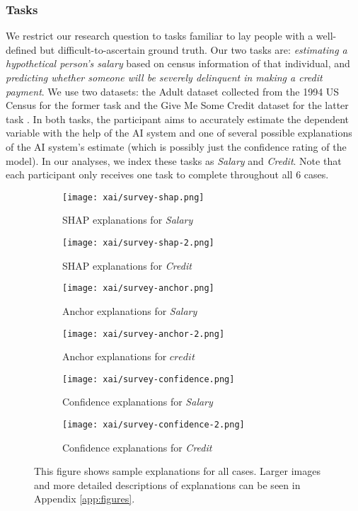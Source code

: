 \subsubsection{Tasks}
We restrict our research question to tasks familiar to lay people with a well-defined but difficult-to-ascertain ground truth. Our two tasks are: \emph{estimating a hypothetical person's salary} based on census information of that individual, and \emph{predicting whether someone will be severely delinquent in making a credit payment}. We use two datasets: the Adult dataset collected from the 1994 US Census for the former task and the Give Me Some Credit dataset for the latter task \cite{kohavi_scaling_1996, GiveMeSomeCredit}. In both tasks, the participant aims to accurately estimate the dependent variable with the help of the AI system and one of several possible explanations of the AI system's estimate (which is possibly just the confidence rating of the model). In our analyses, we index these tasks as \emph{Salary} and \emph{Credit}. Note that each participant only receives one task to complete throughout all 6 cases. 

\begin{figure}[htbp]
    \centering
    \begin{subfigure}[b]{0.45\textwidth}
        \texttt{[image: xai/survey-shap.png]}
        \caption{SHAP explanations for \emph{Salary}}
        \label{fig:shapsalary}
    \end{subfigure}
    \hfill
    \begin{subfigure}[b]{0.45\textwidth}
        \texttt{[image: xai/survey-shap-2.png]}
        \caption{SHAP explanations for \emph{Credit}}
        \label{fig:shapcredit}
    \end{subfigure}
    \medskip
    \begin{subfigure}[b]{0.45\textwidth}
        \texttt{[image: xai/survey-anchor.png]}
        \caption{Anchor explanations for \emph{Salary}}
        \label{fig:anchorsalary}
    \end{subfigure}
    \hfill
    \begin{subfigure}[b]{0.45\textwidth}
        \texttt{[image: xai/survey-anchor-2.png]}
        \caption{Anchor explanations for $credit$}
        \label{fig:anchorcredit}
    \end{subfigure}
    \medskip
    \begin{subfigure}[b]{0.45\textwidth}
        \texttt{[image: xai/survey-confidence.png]}
        \caption{Confidence explanations for \emph{Salary}}
        \label{fig:confidencesalary}
    \end{subfigure}
    \hfill
    \begin{subfigure}[b]{0.45\textwidth}
        \texttt{[image: xai/survey-confidence-2.png]}
        \caption{Confidence explanations for \emph{Credit}}
        \label{fig:confidencecredit}
    \end{subfigure}
    \caption{This figure shows sample explanations for all cases. Larger images and more detailed descriptions of explanations can be seen in Appendix \ref{app:figures}.}
    \label{fig:online_explanations}
\end{figure}

